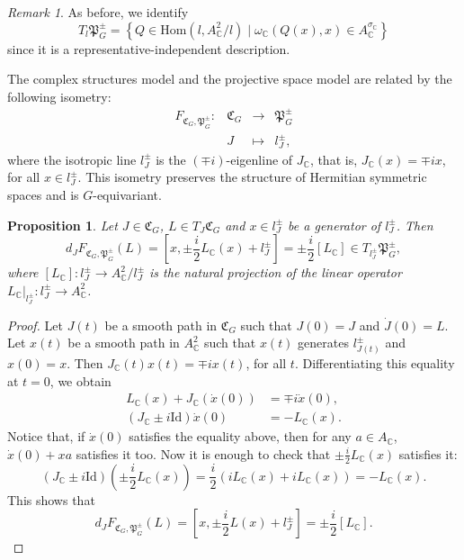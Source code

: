 \documentclass[oneside,11pt]{amsart}
\newtheorem{prop}[thm]{Proposition}
\theoremstyle{definition}
\theoremstyle{remark}
\newtheorem{rem}[thm]{Remark}
\numberwithin{thm}{section}
\numberwithin{equation}{section}
\begin{document}
\begin{rem}
    As before, we identify
    $$T_l\mathfrak{P}_G^\pm=\left\{Q\in\mathrm{Hom}(l,A_\mathbb C^2/l)\mid \omega_\mathbb C(Q(x),x)\in A^{\sigma_\mathbb C}_\mathbb C\right\}$$
    since it is a representative-independent description.
\end{rem}

The complex structures model and the projective space model are related by the following isometry: 
$$
\begin{array}{lccr}
    F_{\mathfrak{C}_G,\mathfrak{P}_G^\pm}\colon &  \mathfrak{C}_G & \to & \mathfrak{P}_G^\pm\\
     & J & \mapsto & l_J^\pm,
\end{array}
$$
where the isotropic line $l_J^\pm$ is the $(\mp i)$-eigenline of $J_\mathbb C$, that is, $J_\mathbb C(x)=\mp ix$, for all $x\in l_J^\pm$. This isometry preserves the structure of Hermitian symmetric spaces and is $G$-equivariant.

\begin{prop}\label{prop:differential_F}
    Let $J\in\mathfrak{C}_G$, $L\in T_J\mathfrak{C}_G$ and $x\in l_J^\pm$ be a generator of $l_J^\pm$. Then
    $$d_JF_{\mathfrak{C}_G,\mathfrak{P}_G^\pm}(L)=[x,\pm\frac{i}{2}L_\mathbb C(x)+l_J^\pm]=\pm\frac{i}{2}[L_\mathbb C]\in T_{l_J^\pm}\mathfrak{P}_G^\pm,$$ 
    where $[L_\mathbb C]\colon l_J^\pm\to A_\mathbb C^2/l_J^\pm$ is the natural projection of the linear operator $L_\mathbb C|_{l_J^\pm}\colon l_J^\pm\to A_\mathbb C^2$.
\end{prop}

\begin{proof}
    Let $J(t)$ be a smooth path in $\mathfrak{C}_G$ such that $J(0)=J$ and $\dot J(0)=L$. Let $x(t)$ be a smooth path in $A^2_\mathbb C$ such that $x(t)$ generates $l_{J(t)}^\pm$ and $x(0)=x$. Then $J_\mathbb C(t)x(t)=\mp ix(t)$, for all $t$. Differentiating this equality at $t=0$, we obtain 
    \begin{align*}
    L_\mathbb C(x)+J_\mathbb C(\dot x(0)) & =\mp i \dot x(0),\\
    (J_\mathbb C\pm i\mathrm{Id})\dot x(0) & =-L_\mathbb C(x).
    \end{align*}
    Notice that, if $\dot x(0)$ satisfies the equality above, then for any $a\in A_\mathbb C$, $\dot x(0)+xa$ satisfies it too. Now it is enough to check that $\pm\frac{i}{2}L_\mathbb C(x)$ satisfies it:
    \[(J_\mathbb C\pm i\mathrm{Id})\left(\pm\frac{i}{2}L_\mathbb C(x)\right)
    =\frac{i}{2}(iL_\mathbb C(x) + iL_\mathbb C(x))=-L_\mathbb C(x).\]
    This shows that 
    $$d_JF_{\mathfrak{C}_G,\mathfrak{P}_G^\pm}(L)=[x,\pm\frac{i}{2}L(x)+l_J^\pm]=\pm\frac{i}{2}[L_\mathbb C].$$
\end{proof}
\end{document}

